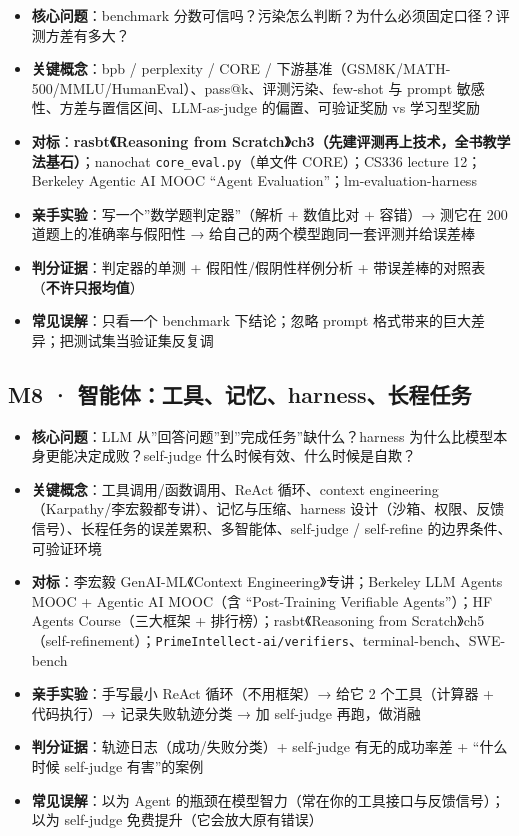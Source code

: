 \documentclass[
  chinese,
  11pt,
]{ctexart}
\providecommand{\tightlist}{%
  \setlength{\itemsep}{0pt}\setlength{\parskip}{0pt}}
\begin{document}
\begin{itemize}
\tightlist
\item
  \textbf{核心问题}：benchmark 分数可信吗？污染怎么判断？为什么必须固定口径？评测方差有多大？
\item
  \textbf{关键概念}：bpb / perplexity / CORE / 下游基准（GSM8K/MATH-500/MMLU/HumanEval）、pass@k、评测污染、few-shot 与 prompt 敏感性、方差与置信区间、LLM-as-judge 的偏置、可验证奖励 vs 学习型奖励
\item
  \textbf{对标}：\textbf{rasbt《Reasoning from Scratch》ch3（先建评测再上技术，全书教学法基石）}；nanochat \texttt{core\_eval.py}（单文件 CORE）；CS336 lecture 12；Berkeley Agentic AI MOOC ``Agent Evaluation''；lm-evaluation-harness
\item
  \textbf{亲手实验}：写一个''数学题判定器''（解析 + 数值比对 + 容错）→ 测它在 200 道题上的准确率与假阳性 → 给自己的两个模型跑同一套评测并给误差棒
\item
  \textbf{判分证据}：判定器的单测 + 假阳性/假阴性样例分析 + 带误差棒的对照表（\textbf{不许只报均值}）
\item
  \textbf{常见误解}：只看一个 benchmark 下结论；忽略 prompt 格式带来的巨大差异；把测试集当验证集反复调
\end{itemize}

\subsection{M8 · 智能体：工具、记忆、harness、长程任务}\label{m8-ux667aux80fdux4f53ux5de5ux5177ux8bb0ux5fc6harnessux957fux7a0bux4efbux52a1}

\begin{itemize}
\tightlist
\item
  \textbf{核心问题}：LLM 从''回答问题''到''完成任务''缺什么？harness 为什么比模型本身更能决定成败？self-judge 什么时候有效、什么时候是自欺？
\item
  \textbf{关键概念}：工具调用/函数调用、ReAct 循环、context engineering（Karpathy/李宏毅都专讲）、记忆与压缩、harness 设计（沙箱、权限、反馈信号）、长程任务的误差累积、多智能体、self-judge / self-refine 的边界条件、可验证环境
\item
  \textbf{对标}：李宏毅 GenAI-ML《Context Engineering》专讲；Berkeley LLM Agents MOOC + Agentic AI MOOC（含 ``Post-Training Verifiable Agents''）；HF Agents Course（三大框架 + 排行榜）；rasbt《Reasoning from Scratch》ch5（self-refinement）；\texttt{PrimeIntellect-ai/verifiers}、terminal-bench、SWE-bench
\item
  \textbf{亲手实验}：手写最小 ReAct 循环（不用框架）→ 给它 2 个工具（计算器 + 代码执行）→ 记录失败轨迹分类 → 加 self-judge 再跑，做消融
\item
  \textbf{判分证据}：轨迹日志（成功/失败分类）+ self-judge 有无的成功率差 + ``什么时候 self-judge 有害''的案例
\item
  \textbf{常见误解}：以为 Agent 的瓶颈在模型智力（常在你的工具接口与反馈信号）；以为 self-judge 免费提升（它会放大原有错误）
\end{itemize}
\end{document}
